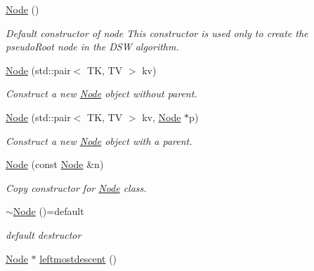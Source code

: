 \begin{DoxyCompactItemize}
\item 
\mbox{\label{structBST_1_1Node_aaa477627f8c31e4073ae78e1df608146}} 
\hyperlink{structBST_1_1Node_aaa477627f8c31e4073ae78e1df608146}{Node} ()
\begin{DoxyCompactList}\small\item\em Default constructor of node This constructor is used only to create the pseudo\+Root node in the D\+SW algorithm. \end{DoxyCompactList}\item 
\hyperlink{structBST_1_1Node_a4b1c0c1a0a0b458bc32e28364795debe}{Node} (std\+::pair$<$ TK, TV $>$ kv)
\begin{DoxyCompactList}\small\item\em Construct a new \hyperlink{structBST_1_1Node}{Node} object without parent. \end{DoxyCompactList}\item 
\hyperlink{structBST_1_1Node_a54fee90481370a764040973e0eb36a7d}{Node} (std\+::pair$<$ TK, TV $>$ kv, \hyperlink{structBST_1_1Node}{Node} $\ast$p)
\begin{DoxyCompactList}\small\item\em Construct a new \hyperlink{structBST_1_1Node}{Node} object with a parent. \end{DoxyCompactList}\item 
\hyperlink{structBST_1_1Node_a841809e77bda00ce2a684c709c4e6e1b}{Node} (const \hyperlink{structBST_1_1Node}{Node} \&n)
\begin{DoxyCompactList}\small\item\em Copy constructor for \hyperlink{structBST_1_1Node}{Node} class. \end{DoxyCompactList}\item 
\mbox{\label{structBST_1_1Node_a800db81be37152601db4d5897e7c1238}} 
\hyperlink{structBST_1_1Node_a800db81be37152601db4d5897e7c1238}{$\sim$\+Node} ()=default
\begin{DoxyCompactList}\small\item\em default destructor \end{DoxyCompactList}\item 
\mbox{\label{structBST_1_1Node_a1d4a810c50aabb9f33571d30bbef1cbd}} 
\hyperlink{structBST_1_1Node}{Node} $\ast$ \hyperlink{structBST_1_1Node_a1d4a810c50aabb9f33571d30bbef1cbd}{leftmostdescent} ()

\end{DoxyCompactItemize}
